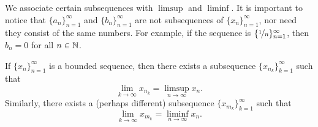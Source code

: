 We associate certain subsequences with $\limsup$ and $\liminf$.
It is important to notice that $\{ a_n \}_{n=1}^\infty$ and
$\{ b_n \}_{n=1}^\infty$ are not
subsequences of $\{ x_n \}_{n=1}^\infty$, nor need they
consist of the same numbers.
For example, if the sequence is $\{ \nicefrac{1}{n} \}_{n=1}^\infty$, then
$b_n = 0$ for all $n \in {\mathbb{N}}$.

\begin{thm} \label{subseqlimsupinf:thm}
If $\{ x_n \}_{n=1}^\infty$ is a bounded sequence, then there exists a subsequence
$\{ x_{n_k} \}_{k=1}^\infty$ such that
\begin{equation*}
\lim_{k\to \infty} x_{n_k} = \limsup_{n \to \infty} x_n .
\end{equation*}
Similarly, there exists a (perhaps different) subsequence
$\{ x_{m_k} \}_{k=1}^\infty$ such that
\begin{equation*}
\lim_{k\to \infty} x_{m_k} = \liminf_{n \to \infty} x_n .
\end{equation*}
\end{thm}

